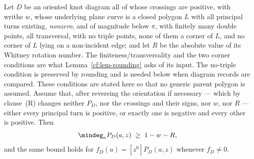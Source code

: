 \begin{theorem}
\begin{enumerate}
Let $D$ be an oriented knot diagram all of whose crossings are positive, with
writhe $w$, whose underlying plane curve is a closed polygon $L$ with all
principal turns existing, \emph{nonzero}, and of magnitude below $\pi$, with
finitely many double points, all transversal, with no triple points, none of
them a corner of $L$, and no corner of $L$ lying on a non-incident edge; and let
$R$ be the absolute value of its Whitney rotation number.  The
finiteness/transversality and the two corner conditions are what
Lemma~\ref{cf:lem-rounding} asks of its input.  The no-triple condition is preserved by rounding and is needed below
when diagram records are compared.  These
conditions are stated here so that no generic parent polygon is assumed. Assume that, after reversing the
orientation if necessary --- which by clause~(R) changes neither
$P_D$, nor the crossings and their signs, nor $w$, nor $R$ --- either every
principal turn is positive, or exactly one is negative and every other is
positive. Then
\begin{equation}
\mindeg_a P_D(a,z)\;\geq\;1-w-R,
\label{cf:eq-floor}
\end{equation}
and the same bound holds for $f_D(a)=[z^0]P_D(a,z)$ whenever $f_D\neq0$.
\end{enumerate}

\end{theorem}
